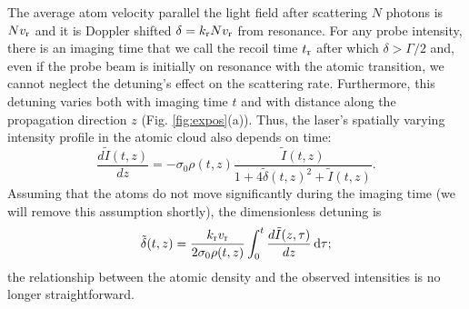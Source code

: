 \documentclass[12pt]{iopart}
\begin{document}
\par The average atom velocity parallel the light field after scattering $N$ photons is $N v_{\rm{r}}$ and it is Doppler shifted  $\delta= k_{\rm{r}} N v_{\rm{r}}$ from resonance. For any probe intensity, there is an imaging time that we call the recoil time $t_{\rm{r}}$ after which  $\delta>\Gamma/2$ and, even if the probe beam is initially on resonance with the atomic transition, we cannot neglect the detuning's  effect on the scattering rate. Furthermore, this detuning varies both with imaging time $t$ and with distance along the propagation direction $z$ (Fig. \ref{fig:expos}(a)). Thus, the laser's spatially varying intensity profile in the atomic cloud also depends on time:
\begin{equation}
\frac{d\tilde{I}(t,z)}{dz}=-\sigma_0 \rho(t,z) \frac{\tilde{I}(t,z)}{1+4\tilde{\delta}(t,z)^2 +\tilde{I}(t,z)}. \label{eq3}
\end{equation}
Assuming that the atoms do not move significantly during the imaging time (we will remove this assumption shortly), the dimensionless detuning is
\begin{equation}
\tilde{\delta}(t,z)=\frac{ k_{\rm{r}} v_{\rm{r}}}{2\sigma_0 \rho(t,z)}\int_0^t \frac{d\tilde{I}(z,\tau)}{dz}\,\mathrm{d}\tau; \label{eq4}
\end{equation}
the relationship between the atomic density and the observed intensities is no longer straightforward.
\end{document}
